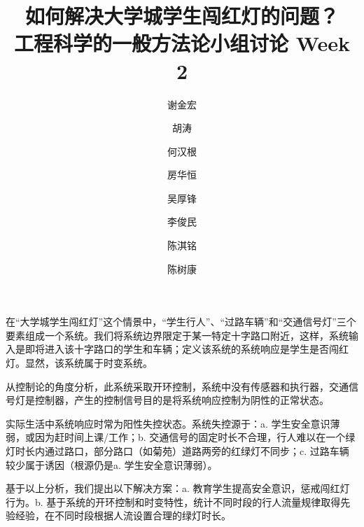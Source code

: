 \documentclass[UTF8]{ctexart}
\title{%
  如何解决大学城学生闯红灯的问题？\\
  \large 工程科学的一般方法论小组讨论 Week 2}
\author{
谢金宏 \and 胡涛 \and 何汉根 \and 房华恒
\and 吴厚锋 \and 李俊民 \and 陈淇铭 \and 陈树康
}
\begin{document}
\maketitle

在“大学城学生闯红灯”这个情景中，“学生行人”、“过路车辆”和“交通信号灯”三个要素组成一个系统。我们将系统边界限定于某一特定十字路口附近，这样，系统输入是即将进入该十字路口的学生和车辆；定义该系统的系统响应是学生是否闯红灯。显然，该系统属于时变系统。

从控制论的角度分析，此系统采取开环控制，系统中没有传感器和执行器，交通信号灯是控制器，产生的控制信号目的是将系统响应控制为阴性的正常状态。

实际生活中系统响应时常为阳性失控状态。系统失控源于：a. 学生安全意识薄弱，或因为赶时间上课/工作；b. 交通信号的固定时长不合理，行人难以在一个绿灯时长内通过路口，部分路口（如菊苑）道路两旁的红绿灯不同步；c. 过路车辆较少属于诱因（根源仍是a. 学生安全意识薄弱）。

基于以上分析，我们提出以下解决方案：a. 教育学生提高安全意识，惩戒闯红灯行为。b. 基于系统的开环控制和时变特性，统计不同时段的行人流量规律取得先验经验，在不同时段根据人流设置合理的绿灯时长。
\end{document}
